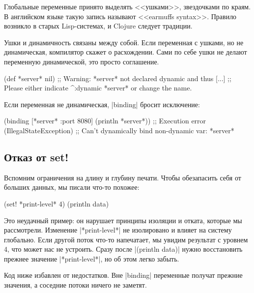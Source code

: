 Глобальные переменные принято выделять <<ушками>>, звездочками по краям. В
английском языке такую запись называют <<earmuffs syntax>>. Правило возникло в
старых Lisp-системах, и Clojure следует традиции.

Ушки и динамичность связаны между собой. Если переменная с ушками, но не
динамическая, компилятор скажет о расхождении. Сами по себе ушки не делают
переменную динамической, это просто соглашение.

\begin{english}
  \begin{clojure}
(def *server* nil)
;; Warning: *server* not declared dynamic and thus [...]
;; Please either indicate ^:dynamic *server* or change the name.
  \end{clojure}
\end{english}

Если переменная не динамическая, \spverb|binding| бросит исключение:

\begin{english}
  \begin{clojure}
(binding [*server* {:port 8080}]
  (println *server*))
;; Execution error (IllegalStateException)
;; Can't dynamically bind non-dynamic var: *server*
  \end{clojure}
\end{english}

\subsection{Отказ от set!}

Вспомним ограничения на длину и глубину печати. Чтобы обезапасить себя от
больших данных, мы писали что-то похожее:

\begin{english}
  \begin{clojure}
(set! *print-level* 4)
(println data)
  \end{clojure}
\end{english}

Это неудачный пример: он нарушает принципы изоляции и отката, которые мы
рассмотрели. Изменение \spverb|*print-level*| не изолировано и влияет на систему
глобально. Если другой поток что-то напечатает, мы увидим результат с уровнем 4,
что может нас не устроить. Сразу после \spverb|(println data)| нужно
восстановить прежнее значение \spverb|*print-level*|, но об этом легко забыть.

Код ниже избавлен от недостатков. Вне \spverb|binding| переменные получат
прежние значения, а соседние потоки ничего не заметят.

